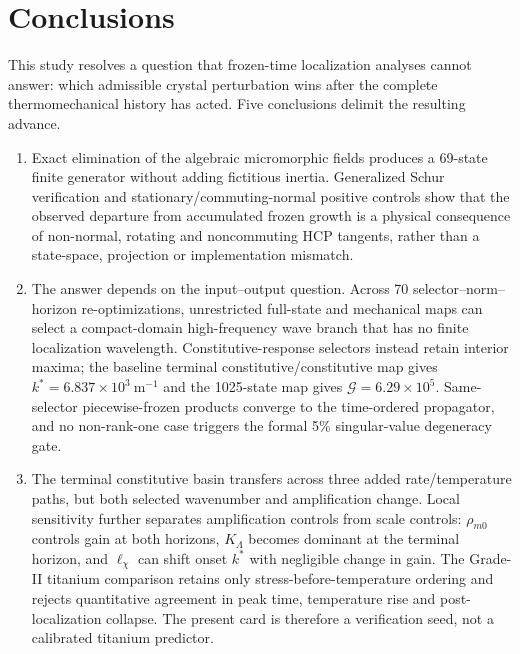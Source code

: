 \section{Conclusions}
\label{sec:conclusions_dynamic}

This study resolves a question that frozen-time localization analyses cannot
answer: which admissible crystal perturbation wins after the complete
thermomechanical history has acted. Five conclusions delimit the resulting
advance.

\begin{enumerate}
\item Exact elimination of the algebraic micromorphic fields produces a
69-state finite generator without adding fictitious inertia. Generalized
Schur verification and stationary/commuting-normal positive controls show
that the observed departure from accumulated frozen growth is a physical
consequence of non-normal, rotating and noncommuting HCP tangents, rather than
a state-space, projection or implementation mismatch.

\item The answer depends on the input--output question. Across 70
selector--norm--horizon re-optimizations, unrestricted full-state and
mechanical maps can select a compact-domain high-frequency wave branch that
has no finite localization wavelength. Constitutive-response selectors
instead retain interior maxima; the baseline terminal
constitutive/constitutive map gives
$k^*=6.837\times10^3~\mathrm{m^{-1}}$ and the 1025-state map gives
$\mathcal G=6.29\times10^5$. Same-selector piecewise-frozen products
converge to the time-ordered propagator, and no non-rank-one case triggers the
formal 5\% singular-value degeneracy gate.

\item The terminal constitutive basin transfers across three added
rate/temperature paths, but both selected wavenumber and amplification change.
Local sensitivity further separates amplification controls from scale
controls: $\rho_{m0}$ controls gain at both horizons, $K_\Lambda$ becomes
dominant at the terminal horizon, and $\ell_\chi$ can shift onset $k^*$ with
negligible change in gain. The
Grade-II titanium comparison retains only stress-before-temperature ordering
and rejects quantitative agreement in peak time, temperature rise and
post-localization collapse. The present card is therefore a verification
seed, not a calibrated titanium predictor.


\end{enumerate}
